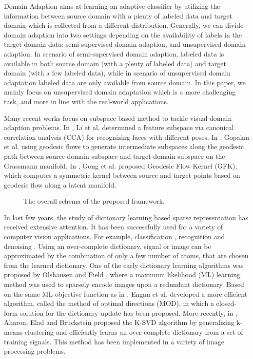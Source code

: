 \documentclass{article}
\begin{document}
  Domain Adaption aims at learning an adaptive classifier by utilizing the information between source domain with a plenty of labeled data and target domain which is collected from a different distribution. Generally, we can divide domain adaption into two settings depending on the availability of labels in the target domain data: semi-supervised domain adaption, and unsupervised domain adaption.
  In scenario of semi-supervised domain adaption, labeled data is available in both source domain (with a plenty of labeled data) and target domain (with a few labeled data), while in scenario of unsupervised domain adaptation labeled data are only available from source domain.  In this paper, we mainly focus on unsupervised domain adaptation which is a more challenging task, and more in line with the real-world applications.

Many recent works \cite{gopalan2011domain,gong2012geodesic,li2009maximizing} focus on subspace based method to tackle visual domain adaption problems. In \cite{li2009maximizing}, Li et al. determined a feature subspace via canonical correlation analysis (CCA) \cite{hotelling1936relations} for recognizing faces with different poses. In \cite{gopalan2011domain}, Gopalan et al. using geodesic flows to generate intermediate subspaces along the geodesic path between source domain subspace and target domain subspace on the Grassmann manifold. In \cite{gong2012geodesic}, Gong et al. proposed Geodesic Flow Kernel (GFK), which computes a symmetric kernel between source and target points based on geodesic flow along a latent manifold.

\begin{figure*}[t]
\label{fig:fig1}
             \caption{The overall schema of the proposed framework.}
             \end{figure*}

In last few years, the study of dictionary learning based sparse representation has received extensive attention. It has been successfully used for a variety of computer vision applications. For example, classification \cite{huang2006sparse}, recognition \cite{wright2009robust} and denoising \cite{elad2006image}.
 Using an over-complete dictionary, signal or image can be approximated by the combination of only a few number of atoms, that are chosen from the learned dictionary. One of the early dictionary learning algorithms was proposed by Olshausen and Field \cite{olshausen1997sparse}, where a maximum likelihood (ML) learning method was used to sparsely encode images upon a redundant dictionary. Based on the same ML objective function as in \cite{olshausen1997sparse}, Engan et al. \cite{engan1999method} developed a more efficient algorithm, called the method of optimal directions (MOD), in which a closed-form solution for the dictionary update has been proposed. More recently, in \cite{aharon2006svd}, Aharon, Elad and Bruckstein proposed the K-SVD algorithm by generalizing k-means clustering and efficiently learns an over-complete dictionary from a set of training signals. This method has been implemented in a variety of image processing problems.
\end{document}
